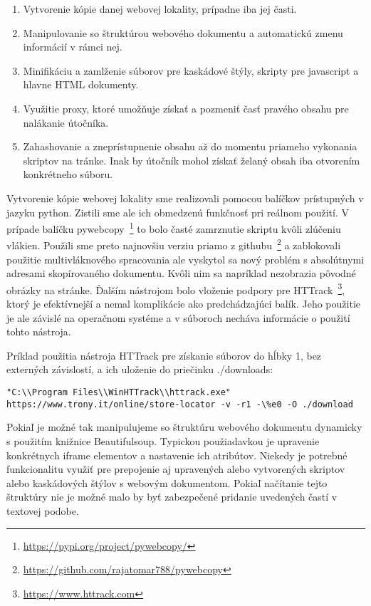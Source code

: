 \documentclass[conference, 11pt,slovak,a4paper,twoside]{IEEEtran}
\begin{document}
\begin{enumerate}
	\item Vytvorenie kópie danej webovej lokality, prípadne iba jej časti. 

	\item Manipulovanie so štruktúrou webového dokumentu a automatickú zmenu informácií v rámci nej.
	
	\item Minifikáciu a zamlženie súborov pre kaskádové štýly, skripty pre javascript a hlavne HTML dokumenty. 

	\item Využitie proxy, ktoré umožňuje získať a pozmeniť časť pravého obsahu pre nalákanie útočníka.
	
	\item Zahashovanie a zneprístupnenie obsahu až do momentu priameho vykonania skriptov na tránke. Inak by útočník mohol získať želaný obsah iba otvorením konkrétneho súboru.
\end{enumerate}

Vytvorenie kópie webovej lokality sme realizovali pomocou balíčkov prístupných v jazyku python. Zistili sme ale ich obmedzenú funkčnosť pri reálnom použití. V prípade balíčku pywebcopy~\footnote{\url{https://pypi.org/project/pywebcopy/}} to bolo časté zamrznutie skriptu kvôli zlúčeniu vlákien. Použili sme preto najnovšiu verziu priamo z githubu~\footnote{\url{https://github.com/rajatomar788/pywebcopy}} a zablokovali použitie multivláknového spracovania ale vyskytol sa nový problém s absolútnymi adresami skopírovaného dokumentu. Kvôli nim sa napríklad nezobrazia pôvodné obrázky na stránke. Ďalším nástrojom bolo vloženie podpory pre HTTrack~\footnote{\url{https://www.httrack.com}}, ktorý je efektívnejší a nemal komplikácie ako predchádzajúci balík. Jeho použitie je ale závislé na operačnom systéme a v súboroch necháva informácie o použití tohto nástroja.

Príklad použitia nástroja HTTrack pre získanie súborov do hĺbky 1, bez externých závislostí, a ich uloženie do priečinku ./downloads:

\begin{lstlisting}
"C:\\Program Files\\WinHTTrack\\httrack.exe" https://www.trony.it/online/store-locator -v -r1 -\%e0 -O ./download
\end{lstlisting}


Pokiaľ je možné tak manipulujeme so štruktúru webového dokumentu dynamicky s použitím knižnice Beautifulsoup. Typickou použiadavkou je upravenie konkrétnych iframe elementov a nastavenie ich atribútov. Niekedy je potrebné funkcionalitu využiť pre prepojenie aj upravených alebo vytvorených skriptov alebo kaskádových štýlov s webovým dokumentom. Pokiaľ načítanie tejto štruktúry nie je možné malo by byť zabezpečené pridanie uvedených častí v textovej podobe.
\end{document}
